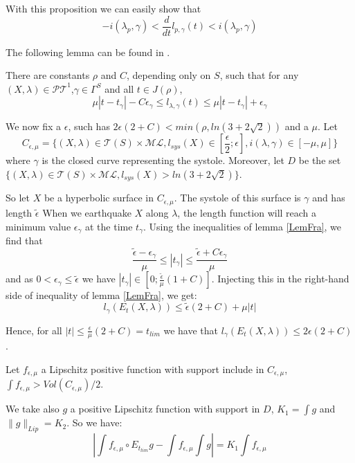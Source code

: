 With this proposition we can easily show that \[
-i(\lambda_p,\gamma) < \frac{d}{dt} l_{p,\gamma}(t) < i(\lambda_p,\gamma)
\]

The following lemma can be found in \cite{articleMetW}.

\begin{lem}\label{LemFra}

There are constants $\rho$ and $C$, depending only on $S$, such that for any $(X, \lambda) \in \mathcal{PT}^1$,$\gamma \in \Gamma^S$
and all $t\in J(\rho)$, \[
\mu |t-t_\gamma |-C \epsilon_\gamma \leq l_{\lambda,\gamma}(t) \leq \mu |t- t_\gamma | + \epsilon_\gamma
\]

\end{lem}

We now fix a $\epsilon$, such has $2 \epsilon(2+C) < min( \rho , ln(3+2 \sqrt{2}))$ and a $\mu$. Let \[
C_{\epsilon,\mu}=\{ (X,\lambda) \in \mathcal{T}(S) \times \mathcal{ML},l_{sys}(X) \in  [\frac{\epsilon}{2};\epsilon], i(\lambda,\gamma) \in [-\mu,\mu]  \}
\]
where $\gamma$ is the closed curve representing the systole. Moreover, let $D$ be the set $\{ (X,\lambda) \in \mathcal{T}(S) \times \mathcal{ML},l_{sys}(X) > ln(3+2 \sqrt{2}) \} $.

So let $X$ be a hyperbolic surface in $C_{\epsilon,\mu}$. The systole of this surface is $\gamma$ and has length $\tilde{\epsilon}$
When we earthquake $X$ along $\lambda$, the length function will reach a minimum value $\epsilon_\gamma$ at the time $t_\gamma$. Using the inequalities of lemma \ref{LemFra}, we find that \[
\frac{\tilde{\epsilon}-\epsilon_\gamma}{\mu} \leq |t_\gamma | \leq \frac{\tilde{\epsilon} + C \epsilon_\gamma}{\mu}
\]
and as $0 < \epsilon_\gamma \leq \tilde{\epsilon}$ we have $|t_\gamma| \in [0; \frac{\tilde{\epsilon}}{\mu}(1+C)]$. Injecting this in the right-hand side of inequality of lemma \ref{LemFra}, we get: \[
l_\gamma (E_t (X,\lambda)) \leq \tilde{\epsilon} (2+C) +\mu |t|
\]

Hence, for all $|t| \leq \frac{\epsilon}{\mu}(2+C) = t_{lim}$ we have that $l_\gamma(E_t(X,\lambda)) \leq 2 \epsilon (2+C)$.

Let $f_{\epsilon,\mu}$ a Lipschitz positive function with support include in $C_{\epsilon,\mu}$, $\int f_{\epsilon,\mu} > Vol(C_{\epsilon,\mu})/2$.

We take also $g$ a positive Lipschitz function with support in $D$, $K_1= \int g$ and $\| g \|_{Lip}= K_2$.
So we have:\[
|\int f_{\epsilon,\mu} \circ E_{t_{lim}} g - \int f_{\epsilon,\mu} \int g |=K_1 \int f_{\epsilon,\mu}
\]

